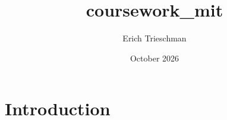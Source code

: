 \documentclass{article}
\title{coursework_mit}
\author{Erich Trieschman}
\date{October 2026}
\begin{document}
\maketitle

\section{Introduction}
\end{document}

